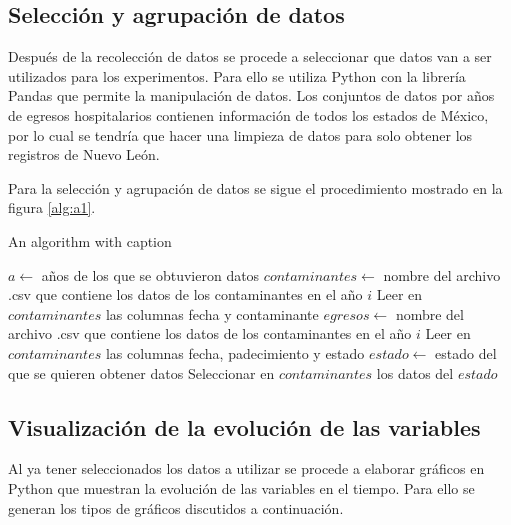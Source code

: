 \subsection{Selección y agrupación de datos}
Después de la recolección de datos se procede a seleccionar que datos van a ser utilizados para los experimentos. Para ello se utiliza Python con la librería Pandas que permite la manipulación de datos. Los conjuntos de datos por años de egresos hospitalarios contienen información de todos los estados de México, por lo cual se tendría que hacer una limpieza de datos para solo obtener los registros de Nuevo León.

Para la selección y agrupación de datos se sigue el procedimiento mostrado en la figura \ref{alg:a1}.

\begin{algorithm}
\caption{An algorithm with caption}\label{alg:a1}
\begin{algorithmic}[1]
\State $a \leftarrow $ años de los que se obtuvieron datos
    \State $contaminantes \leftarrow $ nombre del archivo .csv que contiene los datos de los contaminantes en el año $i$
    \State Leer en $contaminantes$ las columnas fecha y contaminante 
    \State $egresos \leftarrow $ nombre del archivo .csv que contiene los datos de los contaminantes en el año $i$
    \State Leer en $contaminantes$ las columnas fecha, padecimiento y estado
    \State $estado \leftarrow $ estado del que se quieren obtener datos
    \State Seleccionar en $contaminantes$ los datos del $estado$
\EndFor
\end{algorithmic} 
\end{algorithm}

\subsection{Visualización de la evolución de las variables}
Al ya tener seleccionados los datos a utilizar se procede a elaborar gráficos en Python que muestran la evolución de las variables en el tiempo. Para ello se generan los tipos de gráficos discutidos a continuación.


